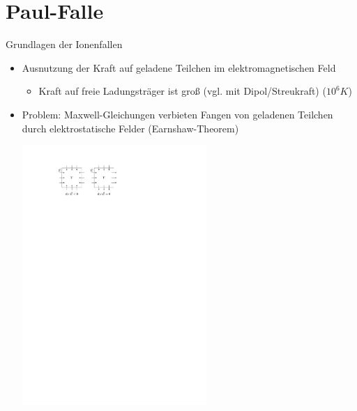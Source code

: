 \documentclass[12pt,xcolor=dvipsnames]{beamer}
\begin{document}
\section{Paul-Falle}

\begin{frame}{Grundlagen der Ionenfallen}
	\begin{itemize}
		\item Ausnutzung der Kraft auf geladene Teilchen im elektromagnetischen Feld
			\begin{itemize}
				\item Kraft auf freie Ladungsträger ist groß (vgl. mit Dipol/Streukraft) ($10^6 \si{K}$)
			\end{itemize}
		
		\item \alert{Problem:} Maxwell-Gleichungen verbieten Fangen von geladenen Teilchen durch elektrostatische Felder (Earnshaw-Theorem)
		
		\vspace{0.5cm}
		\centering
		\includegraphics[width=0.55\textwidth]{./figures/earnshaw.pdf}
		
	\end{itemize}
\end{frame}
\end{document}
